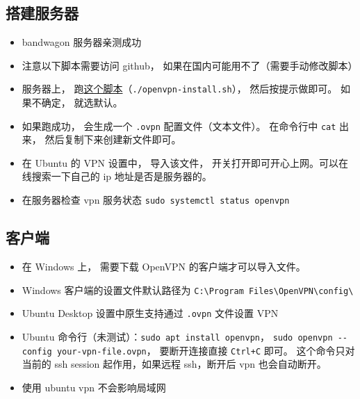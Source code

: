 
\begin{issues}
\issueDraft
\end{issues}

\subsection{搭建服务器}
\begin{itemize}
\item bandwagon 服务器亲测成功
\item 注意以下脚本需要访问 github， 如果在国内可能用不了（需要手动修改脚本）
\item 服务器上， 跑\href{https://github.com/MacroUniverse/openvpn-install/blob/master/openvpn-install.sh}{这个脚本}（\verb`./openvpn-install.sh`）， 然后按提示做即可。 如果不确定， 就选默认。
\item 如果跑成功， 会生成一个 \verb`.ovpn` 配置文件（文本文件）。 在命令行中 \verb`cat` 出来， 然后复制下来创建新文件即可。
\item 在 Ubuntu 的 VPN 设置中， 导入该文件， 开关打开即可开心上网。可以在线搜索一下自己的 ip 地址是否是服务器的。
\item 在服务器检查 vpn 服务状态 \verb`sudo systemctl status openvpn`
\end{itemize}

\subsection{客户端}
\begin{itemize}
\item 在 Windows 上， 需要下载 OpenVPN 的客户端才可以导入文件。
\item Windows 客户端的设置文件默认路径为 \verb`C:\Program Files\OpenVPN\config\`
\item Ubuntu Desktop 设置中原生支持通过 \verb`.ovpn` 文件设置 VPN
\item Ubuntu 命令行（未测试）：\verb`sudo apt install openvpn`， \verb`sudo openvpn --config your-vpn-file.ovpn`， 要断开连接直接 \verb`Ctrl+C` 即可。 这个命令只对当前的 ssh session 起作用，如果远程 ssh，断开后 vpn 也会自动断开。
\item 使用 ubuntu vpn 不会影响局域网
\end{itemize}
